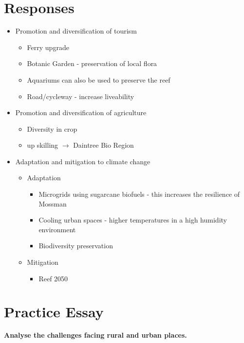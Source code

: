 	\section{Responses}
		\begin{itemize}
			\item Promotion and diversification of tourism
				\begin{itemize}
					\item Ferry upgrade
					\item Botanic Garden - preservation of local flora
					\item Aquariums can also be used to preserve the reef
					\item Road/cycleway - increase liveability
				\end{itemize}
			\item Promotion and diversification of agriculture
				\begin{itemize}
					\item Diversity in crop
					\item up skilling $\rightarrow$ Daintree Bio Region
				\end{itemize}
			\item Adaptation and mitigation to climate change
				\begin{itemize}
					\item Adaptation
						\begin{itemize}
							\item Microgrids using sugarcane biofuels - this increases the resilience of Mossman
							\item Cooling urban spaces - higher temperatures in a high humidity environment
							\item Biodiversity preservation
						\end{itemize}
					\item Mitigation
						\begin{itemize}
							\item Reef 2050
						\end{itemize}
				\end{itemize}
		\end{itemize}

\section{Practice Essay} \label{19/03/2025}

	\textbf{Analyse the challenges facing rural and urban places.}

